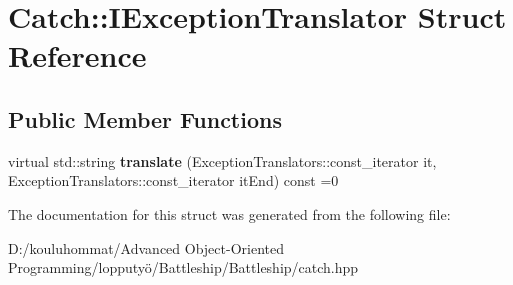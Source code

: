 \hypertarget{struct_catch_1_1_i_exception_translator}{}\section{Catch\+:\+:I\+Exception\+Translator Struct Reference}
\label{struct_catch_1_1_i_exception_translator}
\subsection*{Public Member Functions}
\begin{DoxyCompactItemize}
\item 
\mbox{\label{struct_catch_1_1_i_exception_translator_a2a554b96ed5ed411e7c796b6b42837a5}} 
virtual std\+::string {\bfseries translate} (Exception\+Translators\+::const\+\_\+iterator it, Exception\+Translators\+::const\+\_\+iterator it\+End) const =0
\end{DoxyCompactItemize}


The documentation for this struct was generated from the following file\+:\begin{DoxyCompactItemize}
\item 
D\+:/kouluhommat/\+Advanced Object-\/\+Oriented Programming/lopputyö/\+Battleship/\+Battleship/catch.\+hpp\end{DoxyCompactItemize}
